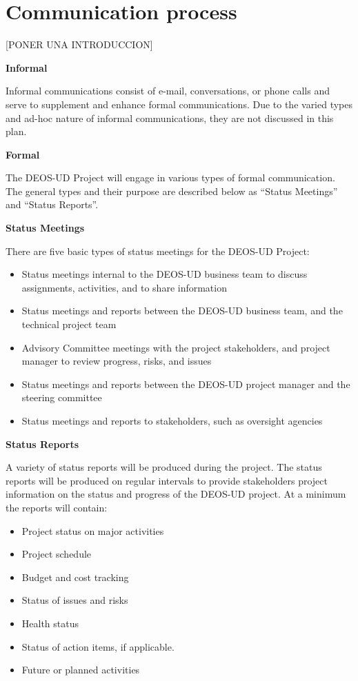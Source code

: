 \section{Communication process}

[PONER UNA INTRODUCCION]

\textbf{Informal}

Informal communications consist of e-mail, conversations, or phone calls and serve to supplement and enhance formal communications. Due to the varied types and ad-hoc nature of informal communications, they are not discussed in this plan.

\textbf{Formal}

The DEOS-UD Project will engage in various types of formal communication. The general types and their purpose are described below as “Status Meetings” and “Status Reports”.

\textbf{Status Meetings}

There are five basic types of status meetings for the DEOS-UD Project:
 \begin{itemize}
	\item Status meetings internal to the DEOS-UD business team to discuss assignments, activities, and to share information
	\item Status meetings and reports between the DEOS-UD business team, and the technical project team
	\item Advisory Committee meetings with the project stakeholders, and project manager to review progress, risks, and issues
	\item Status meetings and reports between the DEOS-UD project manager and the steering committee
	\item Status meetings and reports to stakeholders, such as oversight agencies
 \end{itemize}

\textbf{Status Reports}

A variety of status reports will be produced during the project. The status reports will be produced on regular intervals to provide stakeholders project information on the status and progress of the DEOS-UD project. At a minimum the reports will contain:
 \begin{itemize}
	\item Project status on major activities
	\item Project schedule
	\item Budget and cost tracking
	\item Status of issues and risks
	\item Health status	
	\item Status of action items, if applicable.
	\item Future or planned activities
 \end{itemize}

